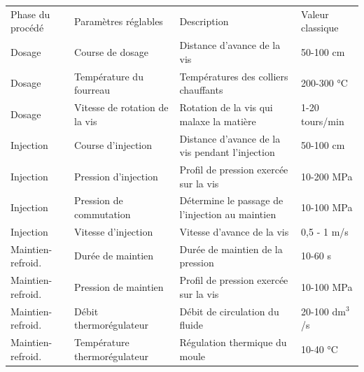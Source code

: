 \begin{table}[bhtp]
	\centering
	\hspace*{-14mm}
	\begin{tabular}{|llll|}
		\arrayrulecolor{black}
		\hhline{----}
		Phase du procédé & Paramètres réglables & Description & Valeur classique \\ \hhline{=:=:=:=:} %
		Dosage                   & Course de dosage                 & Distance d'avance de la vis                                                    & 50-100 cm                      \\
		Dosage                   & Température du fourreau          & Températures des colliers chauffants                                   & 200-300 °C                     \\
		Dosage                   & Vitesse de rotation de la vis    & Rotation de la vis qui malaxe la matière                                                      & 1-20 tours/min                 \\
		Injection                & Course d'injection               & Distance d'avance de la vis pendant l'injection                                               & 50-100 cm                      \\
		Injection                & Pression d'injection             & Profil de pression exercée sur la vis                            & 10-200 MPa                     \\
		Injection                & Pression de commutation          & Détermine le passage de l'injection au maintien & 10-100 MPa                     \\
		Injection                & Vitesse d'injection              & Vitesse d'avance de la vis                                                & 0,5 - 1 m/s                    \\
		Maintien-refroid. & Durée de maintien                & Durée de maintien de la pression                                                & 10-60 s                        \\
		Maintien-refroid. & Pression de maintien             & Profil de pression exercée sur la vis                            & 10-100 MPa                     \\
		Maintien-refroid. & Débit thermorégulateur           & Débit de circulation du fluide                    & 20-100 dm$^3$/s \\
		Maintien-refroid. & Température thermorégulateur     & Régulation thermique du moule                           & 10-40 °C                       \\

\end{tabular}
\end{table}
